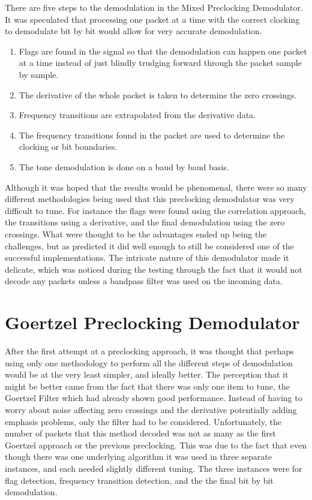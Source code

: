 There are five steps to the demodulation in the Mixed Preclocking Demodulator. It was speculated that processing one packet at a time with the correct clocking to demodulate bit by bit would allow for very accurate demodulation.
\begin{enumerate}
\item Flags are found in the signal so that the demodulation can happen one packet at a time instead of just blindly trudging forward through the packet sample by sample.
\item The derivative of the whole packet is taken to  determine the zero crossings.
\item Frequency transitions are extrapolated from the derivative data.
\item The frequency transitions found in the packet are used to determine the clocking or bit boundaries.
\item The tone demodulation is done on a baud by baud basis.
\end{enumerate}

Although it was hoped that the results would be phenomenal, there were so many different methodologies being used that this preclocking demodulator was very difficult to tune. For instance the flags were found using the correlation approach, the transitions using a derivative, and the final demodulation using the zero crossings. What were thought to be the advantages ended up being the challenges, but as predicted it did well enough to still be considered one of the successful implementations. The intricate nature of this demodulator made it delicate, which was noticed during the testing through the fact that it would not decode any packets unless a bandpass filter was used on the incoming data.

\section{Goertzel Preclocking Demodulator}
After the first attempt at a preclocking approach, it was thought that perhaps using only one methodology to perform all the different steps of demodulation would be at the very least simpler, and ideally better. The perception that it might be better came from the fact that there was only one item to tune, the Goertzel Filter which had already shown good performance. Instead of having to worry about noise affecting zero crossings and the derivative potentially adding emphasis problems, only the filter had to be considered. Unfortunately, the number of packets that this method decoded was not as many as the first Goertzel approach or the previous preclocking. This was due to the fact that even though there was one underlying algorithm it was used in three separate instances, and each needed slightly different tuning. The three instances were for flag detection, frequency transition detection, and the the final bit by bit demodulation.

